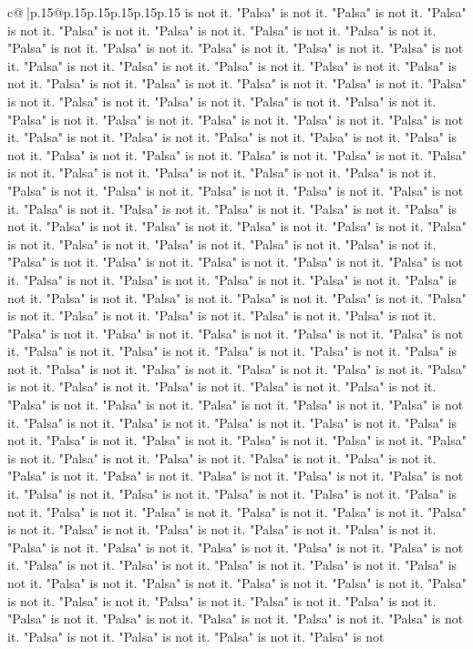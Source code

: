 \documentclass{article}
\begin{document}
{\begin{supertabular}{c@{$\;$}|p{.15\linewidth}@{}p{.15\linewidth}p{.15\linewidth}p{.15\linewidth}p{.15\linewidth}p{.15\linewidth}}
{{{is not it. "Palsa" is not it. "Palsa" is not it. "Palsa" is not it. "Palsa" is not it. "Palsa" is not it. "Palsa" is not it. "Palsa" is not it. "Palsa" is not it. "Palsa" is not it. "Palsa" is not it. "Palsa" is not it. "Palsa" is not it. "Palsa" is not it. "Palsa" is not it. "Palsa" is not it. "Palsa" is not it. "Palsa" is not it. "Palsa" is not it. "Palsa" is not it. "Palsa" is not it. "Palsa" is not it. "Palsa" is not it. "Palsa" is not it. "Palsa" is not it. "Palsa" is not it. "Palsa" is not it. "Palsa" is not it. "Palsa" is not it. "Palsa" is not it. "Palsa" is not it. "Palsa" is not it. "Palsa" is not it. "Palsa" is not it. "Palsa" is not it. "Palsa" is not it. "Palsa" is not it. "Palsa" is not it. "Palsa" is not it. "Palsa" is not it. "Palsa" is not it. "Palsa" is not it. "Palsa" is not it. "Palsa" is not it. "Palsa" is not it. "Palsa" is not it. "Palsa" is not it. "Palsa" is not it. "Palsa" is not it. "Palsa" is not it. "Palsa" is not it. "Palsa" is not it. "Palsa" is not it. "Palsa" is not it. "Palsa" is not it. "Palsa" is not it. "Palsa" is not it. "Palsa" is not it. "Palsa" is not it. "Palsa" is not it. "Palsa" is not it. "Palsa" is not it. "Palsa" is not it. "Palsa" is not it. "Palsa" is not it. "Palsa" is not it. "Palsa" is not it. "Palsa" is not it. "Palsa" is not it. "Palsa" is not it. "Palsa" is not it. "Palsa" is not it. "Palsa" is not it. "Palsa" is not it. "Palsa" is not it. "Palsa" is not it. "Palsa" is not it. "Palsa" is not it. "Palsa" is not it. "Palsa" is not it. "Palsa" is not it. "Palsa" is not it. "Palsa" is not it. "Palsa" is not it. "Palsa" is not it. "Palsa" is not it. "Palsa" is not it. "Palsa" is not it. "Palsa" is not it. "Palsa" is not it. "Palsa" is not it. "Palsa" is not it. "Palsa" is not it. "Palsa" is not it. "Palsa" is not it. "Palsa" is not it. "Palsa" is not it. "Palsa" is not it. "Palsa" is not it. "Palsa" is not it. "Palsa" is not it. "Palsa" is not it. "Palsa" is not it. "Palsa" is not it. "Palsa" is not it. "Palsa" is not it. "Palsa" is not it. "Palsa" is not it. "Palsa" is not it. "Palsa" is not it. "Palsa" is not it. "Palsa" is not it. "Palsa" is not it. "Palsa" is not it. "Palsa" is not it. "Palsa" is not it. "Palsa" is not it. "Palsa" is not it. "Palsa" is not it. "Palsa" is not it. "Palsa" is not it. "Palsa" is not it. "Palsa" is not it. "Palsa" is not it. "Palsa" is not it. "Palsa" is not it. "Palsa" is not it. "Palsa" is not it. "Palsa" is not it. "Palsa" is not it. "Palsa" is not it. "Palsa" is not it. "Palsa" is not it. "Palsa" is not it. "Palsa" is not it. "Palsa" is not it. "Palsa" is not it. "Palsa" is not it. "Palsa" is not it. "Palsa" is not it. "Palsa" is not it. "Palsa" is not it. "Palsa" is not it. "Palsa" is not it. "Palsa" is not it. "Palsa" is not it. "Palsa" is not it. "Palsa" is not it. "Palsa" is not it. "Palsa" is not it. "Palsa" is not it. "Palsa" is not it. "Palsa" is not it. "Palsa" is not it. "Palsa" is not it. "Palsa" is not it. "Palsa" is not it. "Palsa" is not it. "Palsa" is not it. "Palsa" is not it. "Palsa" is not it. "Palsa" is not it. "Palsa" is not it. "Palsa" is not it. "Palsa" is not it. "Palsa" is not it. "Palsa" is not it. "Palsa" is not it. "Palsa" is not }}}
\end{supertabular}}
\end{document}
